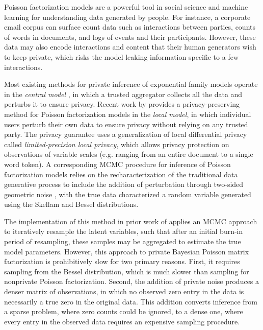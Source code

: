 \documentclass{article}
\begin{document}
  Poisson factorization models are a powerful tool in social science and machine
  learning for understanding data generated by people. For instance, a corporate
  email corpus can surface count data such as interactions between parties,
  counts of words in documents, and logs of events and their participants. However, these data may also encode interactions
  and content that their human generators wish to keep private, which risks the model leaking information specific to a few interactions.
  
  Most existing methods for private inference of exponential family models
  operate in the \emph{central model}
  \citep{park2016private,bernstein2018differentially}, in which a trusted
  aggregator collects all the data and perturbs it to ensure privacy. Recent
  work by \cite{schein2018locally} provides a privacy-preserving method for
  Poisson factorization models in the \emph{local model}, in which individual
  users perturb their own data to ensure privacy without relying on any trusted
  party. The privacy guarantee uses a generalization of local differential
  privacy \citep{warner1965randomized} called \textit{limited-precision local
  privacy}, which allows privacy protection on observations of variable scales
  (e.g. ranging from an entire document to a single word token). A corresponding
  MCMC procedure for inference of Poisson factorization models relies on the
  recharacterization of the traditional data generative process to include the
  addition of perturbation through two-sided geometric noise
  \citep{ghosh2012universally}, with the true data characterized a random
  variable generated using the Skellam and Bessel distributions.
  
  The implementation of this method in prior work of \citep{schein2018locally}
  applies an MCMC approach to iteratively resample the latent variables, such
  that after an initial burn-in period of resampling, these samples may be
  aggregated to estimate the true model parameters. However, this approach to
  private Bayesian Poisson matrix factorization is prohibitively slow for two
  primary reasons. First, it requires sampling from the Bessel distribution,
  which is much slower than sampling for nonprivate Poisson factorization.
  Second, the addition of private noise produces a denser matrix of
  observations, in which no observed zero entry in the data is necessarily a
  true zero in the original data. This addition converts inference from a sparse
  problem, where zero counts could be ignored, to a dense one, where every entry
  in the observed data requires an expensive sampling procedure.
  
\end{document}

